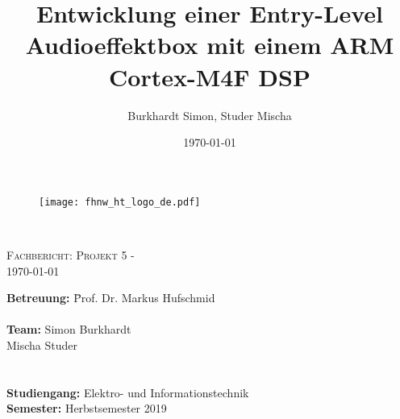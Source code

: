 \documentclass[final]{fhnwreport}       %
\title{\textbf{Entwicklung einer Entry-Level Audioeffektbox mit einem ARM Cortex-M4F DSP}}  		        %
\author{Burkhardt Simon, Studer Mischa} %
\date{\today}          				   %
\begin{document}
\thispagestyle{empty}
	\begin{figure}
		 \vspace*{-\topskip}\vspace*{-\headsep}
		\texttt{[image: fhnw\_ht\_logo\_de.pdf]}
	\end{figure}
	\begin{center}
		\vspace*{2cm}
		{\huge{\textbf{\thetitle}}}\\
		\vspace*{0.5cm}
		
		{\scshape\Large Fachbericht: Projekt 5 - \theauthor \\} \Large{\today}
		\vfill
		\begin{normalsize}
			{\begin{tabbing}
					\textbf{Betreuung:} \hspace{5cm}\= Prof. Dr. Markus Hufschmid\\
					
					
					\\[0.8cm]
					\textbf{Team:} \> Simon Burkhardt\\ 
					\> Mischa Studer\\
					\\[0.8cm]
					\\[0.8cm]
					\textbf{Studiengang:} \>Elektro- und Informationstechnik
					\\[0.8cm]	\textbf{Semester:} \>Herbstsemester 2019
			\end{tabbing}}
		\end{normalsize}
		\vfill
	\end{center}
\clearpage

\thispagestyle{empty}
\begin{otherlanguage}{english}

\end{otherlanguage}

\tableofcontents
\clearpage
\end{document}
